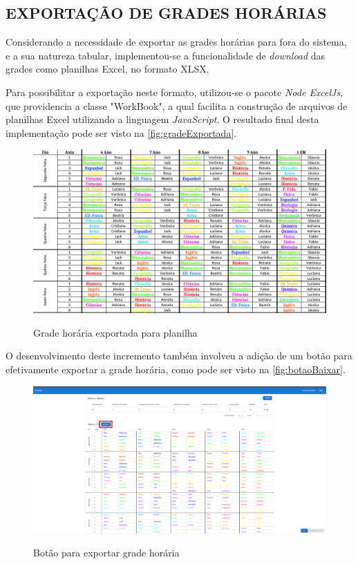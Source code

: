 \subsection{EXPORTAÇÃO DE GRADES HORÁRIAS}

Considerando a necessidade de exportar as grades horárias para fora do sistema, e a sua natureza tabular, implementou-se a funcionalidade de \textit{download} das grades como planilhas Excel, no formato XLSX.

Para possibilitar a exportação neste formato, utilizou-se o pacote \textit{Node ExcelJs}, que providencia a classe "WorkBook", a qual facilita a construção de arquivos de planilhas Excel utilizando a linguagem \textit{JavaScript}. O resultado final desta implementação pode ser visto na \autoref{fig:gradeExportada}.

\begin{figure}[!htb]
	\centering
	\caption{Grade horária exportada para planilha}
	\includegraphics[width=1\textwidth]{./dados/figuras/gradeExportada}
	\label{fig:gradeExportada}
\end{figure}

O desenvolvimento deste incremento também involveu a adição de um botão para efetivamente exportar a grade horária, como pode ser visto na \autoref{fig:botaoBaixar}.

\begin{figure}[!htb]
	\centering
	\caption{Botão para exportar grade horária}
	\includegraphics[width=1\textwidth]{./dados/figuras/botaoBaixar}
	\label{fig:botaoBaixar}
\end{figure}